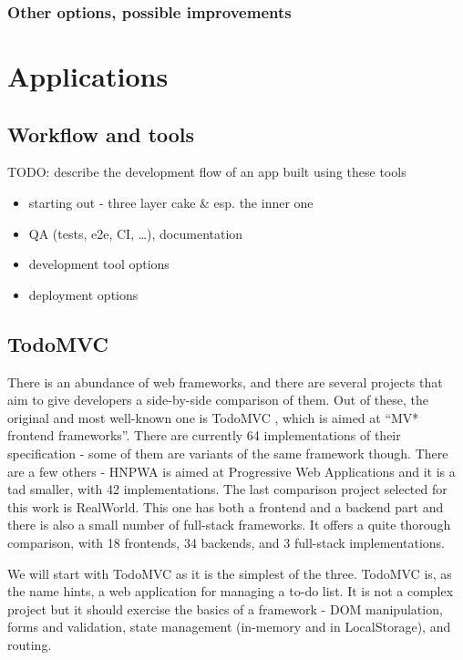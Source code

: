 \documentclass[english,odsaz]{fitthesis}
\begin{document}
\subsection{Other options, possible improvements}
\label{sec:orgc62f4c2}

\chapter{Applications}
\label{sec:org1d18f95}
\section{Workflow and tools}
\label{sec:org92233e8}
TODO: describe the development flow of an app built using these tools

\begin{itemize}
\item starting out - three layer cake \& esp. the inner one
\item QA (tests, e2e, CI, \ldots{}), documentation
\item development tool options
\item deployment options
\end{itemize}

\section{TodoMVC}
\label{sec:org0b0083e}
There is an abundance of web frameworks, and there are several projects that aim
to give developers a side-by-side comparison of them. Out of these, the original
and most well-known one is TodoMVC \cite{todomvc}, which is aimed at ``MV* frontend
frameworks''. There are currently 64 implementations of their specification -
some of them are variants of the same framework though. There are a few others -
HNPWA is aimed at Progressive Web Applications and it is a tad smaller, with 42
implementations. The last comparison project selected for this work is
RealWorld. This one has both a frontend and a backend part and there is also a
small number of full-stack frameworks. It offers a quite thorough comparison,
with 18 frontends, 34 backends, and 3 full-stack implementations.

We will start with TodoMVC as it is the simplest of the three. TodoMVC is, as
the name hints, a web application for managing a to-do list. It is not a complex
project but it should exercise the basics of a framework - DOM manipulation,
forms and validation, state management (in-memory and in LocalStorage), and
routing.
\end{document}
